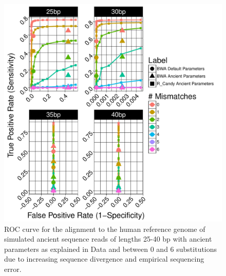 \documentclass[11pt,a4paper]{report}
\begin{document}
\begin{figure}[H]
\centering
\includegraphics[width=12cm]{pictures/f_DS4_ART.pdf}
\caption{
ROC curve for the alignment to the human reference genome of simulated ancient 
sequence reads of lengths 25-40 bp with ancient parameters as explained in Data 
and between 0 and 6 substitutions due to increasing sequence divergence and
empirical sequencing error.
}
\label{DS4_ART}
\end{figure}





\end{document}
